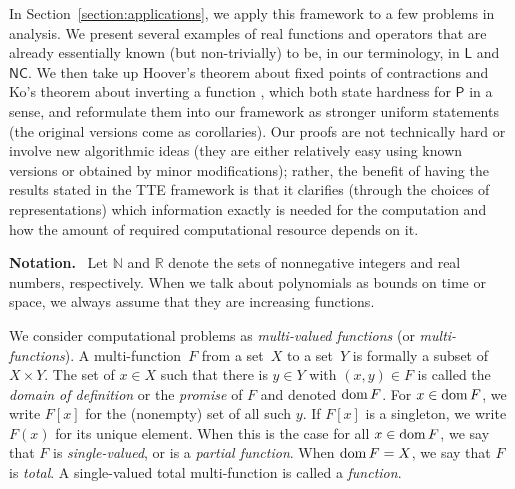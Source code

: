 \documentclass[envcountsect,envcountsame,orivec,oribibl]{llncs}
\newcommand{\R}{\mathbb R}
\newcommand{\N}{\mathbb N}
\newcommand{\classonefont}[1]{\mathsf{#1}}
\newcommand{\classL}{\classonefont{L}}
\newcommand{\classP}{\classonefont{P}}
\newcommand{\classNC}{\classonefont{NC}}
\newcommand{\classtwofont}[1]{\text{\bfseries \sffamily \upshape #1}}
\newcommand{\classLtwo}{\classtwofont{L}}
\newcommand{\classPtwo}{\classtwofont{P}}
\newcommand{\dom}{\mathop{\rm dom}}
\begin{document}
In Section~\ref{section:applications}, 
we apply this framework to a few problems in analysis.
We present several examples of real functions and operators 
that are already essentially known (but non-trivially) to be, 
in our terminology, 
in $\classL$ and $\classNC$. 
We then take up
Hoover's theorem about fixed points of contractions \cite{hoover1991real}
and Ko's theorem about inverting a function \cite{ko1991complexity}, 
which both state hardness for $\classP$ in a sense, 
and reformulate them into our framework
as stronger uniform statements (the original versions come as corollaries).
Our proofs are not technically hard or involve new algorithmic ideas 
(they are either relatively easy using known versions or 
obtained by minor modifications); 
rather, the benefit of having the results stated in the TTE framework 
is that it clarifies (through the choices of representations) 
which information exactly is needed for the computation
and how the amount of required computational resource depends on it. 


\smallskip

\noindent\textbf{Notation.} \ 
Let $\N$ and $\R$ denote the sets of nonnegative integers and 
real numbers, respectively.
When we talk about polynomials as bounds on time or space, 
we always assume that they are increasing functions. 

We consider computational problems as 
\emph{multi-valued functions} (or {\em multi-functions}). 
A multi-function~$F$ from a set~$X$ to a set~$Y$
is formally a subset of $X \times Y$. 
The set of $x \in X$ such that 
there is $y \in Y$ with $(x, y) \in F$ 
is called the 
\emph{domain of definition} 
or the 
\emph{promise} 
of $F$ and denoted 
$\dom F$. 
For $x \in \dom F$, 
we write 
$F [x]$ for the (nonempty) set of all such $y$. 
If $F [x]$ is a singleton, 
we write 
$F (x)$ for its unique element. 
When this is the case for all $x \in \dom F$, 
we say that $F$ is 
\emph{single-valued}, 
or is a 
\emph{partial function}. 
When $\dom F = X$, 
we say that $F$ is 
\emph{total}. 
A single-valued total multi-function is called a 
\emph{function}. 
\end{document}
